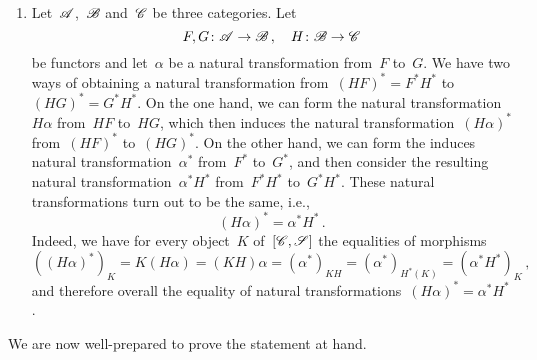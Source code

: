 \begin{enumerate}
	\item
		Let~$\mathscr{A}$,~$\mathscr{B}$ and~$\mathscr{C}$ be three categories.
		Let
		\[
			F, G \colon \mathscr{A} \to \mathscr{B} \,,
			\quad
			H \colon \mathscr{B} \to \mathscr{C}
		\]
		be functors and let~$α$ be a natural transformation from~$F$ to~$G$.
		We have two ways of obtaining a natural transformation from~$(H F)^* = F^* H^*$ to~$(H G)^* = G^* H^*$.
		On the one hand, we can form the natural transformation~$H α$ from~$H F$ to~$H G$, which then induces the natural transformation~$(H α)^*$ from~$(H F)^*$ to~$(H G)^*$.
		On the other hand, we can form the induces natural transformation~$α^*$ from~$F^*$ to~$G^*$, and then consider the resulting natural transformation~$α^* H^*$ from~$F^* H^*$ to~$G^* H^*$.
		These natural transformations turn out to be the same, i.e.,
		\[
			(H α)^* = α^* H^* \,.
		\]
		Indeed, we have for every object~$K$ of~$[\mathscr{C}, \mathscr{S}]$ the equalities of morphisms
		\[
			( (H α)^* )_K
			=
			K (H α)
			=
			(K H) α
			=
			(α^*)_{K H}
			=
			(α^*)_{H^*(K)}
			=
			(α^* H^*)_K \,,
		\]
		and therefore overall the equality of natural transformations~$(H α)^* = α^* H^*$.
\end{enumerate}

We are now well-prepared to prove the statement at hand.

